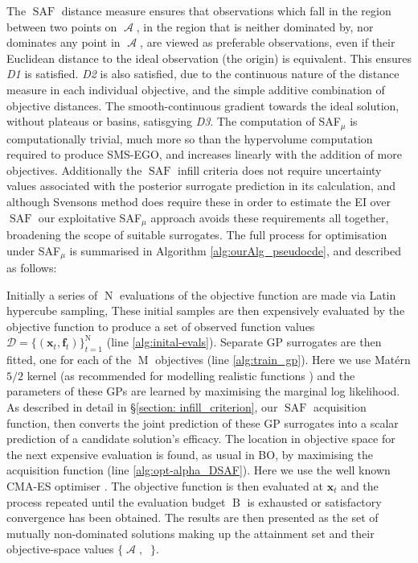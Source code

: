 \documentclass[conference]{IEEEtran}
\DeclareMathOperator*{\evaluatedx}{\bX}
\DeclareMathOperator*{\attainmentfront}{\mathcal{A}}
\DeclareMathOperator*{\attainmentset}{\evaluatedx_{\mathcal{A}}}
\DeclareMathOperator*{\ninitialevaluations}{N}
\DeclareMathOperator*{\nbudget}{B}
\DeclareMathOperator*{\nobj}{M}
\DeclareMathOperator*{\saf}{SAF}
\newcommand\safmu{SAF$_{\mu}$\xspace}
\newcommand\smsego{SMS-EGO\xspace}
\newcommand\ei{EI\xspace}
\newcommand\gp{GP\xspace}
\newcommand\gps{GPs\xspace}
\newcommand{\bx}{\mathbf{x}}
\newcommand{\bX}{\mathbf{X}}
\newcommand{\bff}{\mathbf{f}}
\newcommand{\data}{\mathcal{D}}
\begin{document}
The $\saf$ distance measure ensures that observations which fall in the region between two points on $\attainmentfront$, in the region that is neither dominated by, nor dominates any point in $\attainmentfront$, are viewed as preferable observations, even if their Euclidean distance to the ideal observation (the origin) is equivalent. This ensures \textit{D1} is satisfied. \textit{D2} is also satisfied, due to the continuous nature of the distance measure in each individual objective, and the simple additive combination of objective distances. The smooth-continuous gradient towards the ideal solution, without plateaus or basins, satisgying \textit{D3}. The computation of \safmu is computationally trivial, much more so than the hypervolume computation required to produce \smsego, and increases linearly with the addition of more objectives. Additionally the $\saf$ infill criteria does not require uncertainty values associated with the posterior surrogate prediction in its calculation, and although Svensons \cite{svenson2016multiobjective} method does require these in order to estimate the \ei over $\saf$ our exploitative \safmu approach avoids these requirements all together, broadening the scope of suitable surrogates. The full process for optimisation under \safmu is summarised in Algorithm  \ref{alg:ourAlg_pseudocde}, and described as follows:

Initially a series of $\ninitialevaluations$ evaluations of the objective function are made via  Latin hypercube sampling, These initial samples are then expensively evaluated by the objective function to produce a set of observed function values  $\data = \{(\bx_t, \bff_t)\}_{t=1}^{\ninitialevaluations}$ (line \ref{alg:inital-evals}). Separate \gp surrogates are then fitted, one for each of the $\nobj$ objectives (line \ref{alg:train_gp}). Here we use Mat{\'e}rn $5/2$ kernel (as recommended for modelling realistic functions \cite{snoek2012practical}) and the parameters of these \gps are
learned by maximising the marginal log likelihood. As described in detail in \S\ref{section: infill_criterion}, our $\saf$ acquisition function, then converts the joint prediction
of these GP surrogates into a scalar prediction of a candidate solution's
efficacy. The location in objective space for the next expensive
evaluation is found, as usual in BO, by maximising the acquisition function
(line \ref{alg:opt-alpha_DSAF}).  Here we use the well known CMA-ES optimiser
 \cite{hansen2003reducing}. The objective function is then evaluated at
 $\mathbf{x}_t$ and the process repeated until the evaluation budget $\nbudget$ is
 exhausted or satisfactory convergence has been obtained. The results are then presented as the set of mutually non-dominated solutions making up the attainment set and their objective-space values $\{\attainmentfront, \attainmentset\}$.
\end{document}
